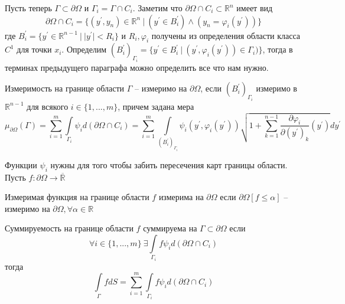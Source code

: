 \documentclass[12pt,a4paper]{article}
\newcommand{\intset}[1]{\int\limits_{#1}}
\newcommand{\Real}{\mathbb{R}}
\begin{document}
Пусть теперь $\Gamma \subset \partial \Omega$ и $\Gamma_i = \Gamma \cap C_i$. Заметим что $\partial \Omega \cap C_i \subset \Real^n$ имеет вид
\begin{equation*}
	\partial \Omega \cap C_i = \{ (y^\prime, y_n) \in \Real^n \ | \ (y^\prime \in B_i^\prime) \wedge (y_n = \varphi_i (y^\prime)) \}
\end{equation*}
где $B_i^\prime = \{ y^\prime \in \Real^{n-1} \ | \ |y^\prime| < R_i \}$ и $R_i, \varphi_i$ получены из определения области класса $C^1$ для точки $x_i$. Определим $(B_i^\prime)_{\Gamma_i} = \{ y^\prime \in B_i^\prime \ | \ (y^\prime, \varphi_i (y^\prime)) \in \Gamma_i)\}$, тогда в терминах предыдущего параграфа можно определить все что нам нужно.

\begin{definition}{Измеримость на границе области}{}
	$\Gamma$ -- измеримо на $\partial \Omega$, если $(B_i^\prime)_{\Gamma_i}$ измеримо в $\Real^{n-1}$ для всякого $i \in \{1, ..., m\}$, причем задана мера
	\begin{equation*}
		\mu_{\partial \Omega}(\Gamma) = \sum\limits_{i=1}^{m}{\intset{\Gamma_i}{\psi_i d (\partial \Omega \cap C_i)}} = \sum\limits_{i=1}^{m}{\intset{(B_i^\prime)_{\Gamma_i}}{\psi_i (y^\prime, \varphi_i (y^\prime)) \sqrt{1 + \sum\limits_{k=1}^{n-1}{\frac{\partial \varphi_i}{\partial (y^\prime)_k} (y^\prime)}} dy^\prime} }
	\end{equation*}
\end{definition}
Функции $\psi_i$ нужны для того чтобы забить пересечения карт границы области. Пусть $f : \partial \Omega \to \overline{\Real}$

\begin{definition}{Измеримая функция на границе области}{}
	$f$ измерима на $\partial \Omega$ если $\partial \Omega [f \leq \alpha]$ -- измеримо на $\partial \Omega, \forall \alpha \in \Real$
\end{definition}

\begin{definition}{Суммируемость на границе области}{}
	$f$ суммируема на $\Gamma \subset \partial \Omega$ если
	\begin{equation*}
		\forall i \in \{1, ..., m\} \ \exists \intset{\Gamma_i}{f \psi_i d(\partial \Omega \cap C_i)}
	\end{equation*}
	тогда
	\begin{equation*}
		\intset{\Gamma}{f dS} = \sum\limits_{i=1}^{m}{\intset{\Gamma_i}{f \psi_i d(\partial \Omega \cap C_i)}}
	\end{equation*}
\end{definition}
\end{document}
